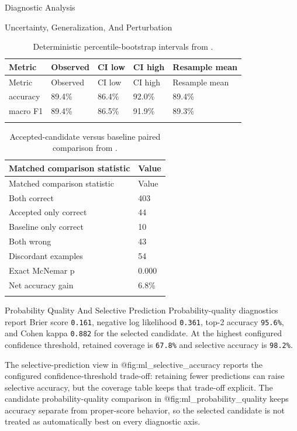 \documentclass[
  ignorenonframetext,
]{beamer}
\begin{document}
\begin{frame}{Diagnostic Analysis}
\begin{block}{Uncertainty, Generalization, And Perturbation}
\begin{longtable}[]{@{}lllll@{}}
\caption{Deterministic percentile-bootstrap intervals from
\protect{}.}\label{tbl:bootstrap-intervals}\tabularnewline
\toprule\noalign{}
Metric & Observed & CI low & CI high & Resample mean \\
\midrule\noalign{}
\endfirsthead
\toprule\noalign{}
Metric & Observed & CI low & CI high & Resample mean \\
\midrule\noalign{}
\endhead
accuracy & 89.4\% & 86.4\% & 92.0\% & 89.4\% \\
macro F1 & 89.4\% & 86.5\% & 91.9\% & 89.3\% \\
\bottomrule\noalign{}
\end{longtable}

\begin{longtable}[]{@{}ll@{}}
\caption{Accepted-candidate versus baseline paired comparison from
\protect{}.}\label{tbl:paired-comparison}\tabularnewline
\toprule\noalign{}
Matched comparison statistic & Value \\
\midrule\noalign{}
\endfirsthead
\toprule\noalign{}
Matched comparison statistic & Value \\
\midrule\noalign{}
\endhead
Both correct & 403 \\
Accepted only correct & 44 \\
Baseline only correct & 10 \\
Both wrong & 43 \\
Discordant examples & 54 \\
Exact McNemar p & 0.000 \\
Net accuracy gain & 6.8\% \\
\bottomrule\noalign{}
\end{longtable}
\end{block}

\begin{block}{Probability Quality And Selective Prediction}
\protect{}\label{sec:probability-quality-selective-prediction}
Probability-quality diagnostics report Brier score \texttt{0.161},
negative log likelihood \texttt{0.361}, top-2 accuracy \texttt{95.6\%},
and Cohen kappa \texttt{0.882} for the selected candidate. At the
highest configured confidence threshold, retained coverage is
\texttt{67.8\%} and selective accuracy is \texttt{98.2\%}.

The selective-prediction view in @fig:ml\_selective\_accuracy reports
the configured confidence-threshold trade-off: retaining fewer
predictions can raise selective accuracy, but the coverage table keeps
that trade-off explicit. The candidate probability-quality comparison in
@fig:ml\_probability\_quality keeps accuracy separate from proper-score
behavior, so the selected candidate is not treated as automatically best
on every diagnostic axis.


\end{block}
\end{frame}
\end{document}
